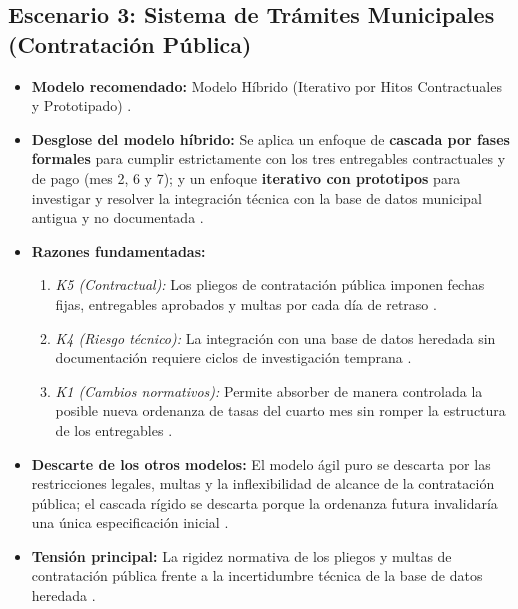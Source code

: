 \documentclass{article}
\begin{document}
\subsection{Escenario 3: Sistema de Trámites Municipales (Contratación Pública)}
\begin{itemize}
    \item \textbf{Modelo recomendado:} Modelo Híbrido (Iterativo por Hitos Contractuales y Prototipado) \cite{GA_Prac_01}.
    \item \textbf{Desglose del modelo híbrido:} Se aplica un enfoque de \textbf{cascada por fases formales} para cumplir estrictamente con los tres entregables contractuales y de pago (mes 2, 6 y 7); y un enfoque \textbf{iterativo con prototipos} para investigar y resolver la integración técnica con la base de datos municipal antigua y no documentada \cite{GA_Prac_01}.
    \item \textbf{Razones fundamentadas:}
        \begin{enumerate}
            \item \textit{K5 (Contractual):} Los pliegos de contratación pública imponen fechas fijas, entregables aprobados y multas por cada día de retraso \cite{GA_Prac_01}.
            \item \textit{K4 (Riesgo técnico):} La integración con una base de datos heredada sin documentación requiere ciclos de investigación temprana \cite{GA_Prac_01, Pohl2025}.
            \item \textit{K1 (Cambios normativos):} Permite absorber de manera controlada la posible nueva ordenanza de tasas del cuarto mes sin romper la estructura de los entregables \cite{GA_Prac_01}.
        \end{enumerate}
    \item \textbf{Descarte de los otros modelos:} El modelo ágil puro se descarta por las restricciones legales, multas y la inflexibilidad de alcance de la contratación pública; el cascada rígido se descarta porque la ordenanza futura invalidaría una única especificación inicial \cite{GA_Prac_01}.
    \item \textbf{Tensión principal:} La rigidez normativa de los pliegos y multas de contratación pública frente a la incertidumbre técnica de la base de datos heredada \cite{GA_Prac_01}.
\end{itemize}
\end{document}
